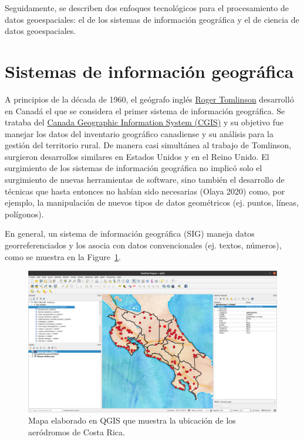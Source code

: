 \documentclass[
  letterpaper,
  DIV=11,
  numbers=noendperiod]{scrreprt}
\begin{document}
Seguidamente, se describen dos enfoques tecnológicos para el
procesamiento de datos geoespaciales: el de los sistemas de información
geográfica y el de ciencia de datos geoespaciales.

\hypertarget{sistemas-de-informaciuxf3n-geogruxe1fica}{%
\section{Sistemas de información
geográfica}\label{sistemas-de-informaciuxf3n-geogruxe1fica}}

A principios de la década de 1960, el geógrafo inglés
\href{https://es.wikipedia.org/wiki/Roger_Tomlinson}{Roger Tomlinson}
desarrolló en Canadá el que se considera el primer sistema de
información geográfica. Se trataba del
\href{https://en.wikipedia.org/wiki/Canada_Geographic_Information_System}{Canada
Geographic Information System (CGIS)} y su objetivo fue manejar los
datos del inventario geográfico canadiense y su análisis para la gestión
del territorio rural. De manera casi simultánea al trabajo de Tomlinson,
surgieron desarrollos similares en Estados Unidos y en el Reino Unido.
El surgimiento de los sistemas de información geográfica no implicó solo
el surgimiento de nuevas herramientas de software, sino también el
desarrollo de técnicas que hasta entonces no habían sido necesarias
(Olaya 2020) como, por ejemplo, la manipulación de nuevos tipos de datos
geométricos (ej. puntos, líneas, polígonos).

En general, un sistema de información geográfica (SIG) maneja datos
georreferenciados y los asocia con datos convencionales (ej. textos,
números), como se muestra en la Figure~\ref{fig-mapa-qgis}.

\begin{figure}

{\centering \includegraphics[width=6.17in,height=\textheight]{./img/mapa-qgis.png}

}

\caption{\label{fig-mapa-qgis}Mapa elaborado en QGIS que muestra la
ubicación de los aeródromos de Costa Rica.}

\end{figure}
\end{document}
